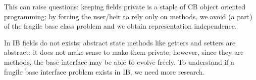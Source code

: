 This can raise questions: keeping fields private is a staple of CB object oriented programming;
by forcing the user/heir to rely only on methods, we avoid (a part)
of the fragile base class problem and we obtain representation independence.

In IB fields do not exists; abstract state methods like getters and setters are abstract:
it does not make sense to make them private; however, since they are methods,
the base interface may be able to evolve freely.
To understand if a fragile base interface problem exists in IB, we need more research.



%
%
%
%
%
%



